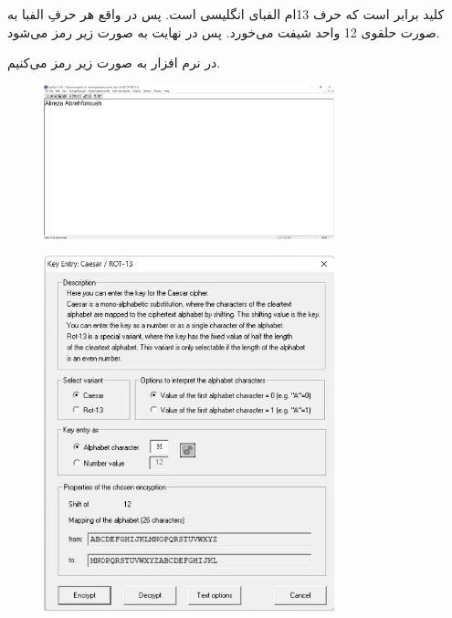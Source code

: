 \documentclass{article}
\begin{document}
\subsubsection{}
کلید  برابر  است که حرف 13ام الفبای انگلیسی است. پس در واقع هر حرفِ الفبا به صورت حلقوی 12 واحد شیفت می‌خورد. پس در نهایت به صورت زیر رمز می‌شود.
\begin{latin}
\begin{table}[H]
\centering
{}
\end{table}
\end{latin}
در نرم افزار  به صورت زیر رمز می‌کنیم.
\begin{figure}[H]
    \centering
    \includegraphics[width=0.75\textwidth]{figures/1a.jpg}
    \caption
	{}
    \label{fig:fig1}
\end{figure}

\begin{figure}[H]
    \centering
    \includegraphics[width=0.75\textwidth]{figures/1b.jpg}
    \caption
	{}
    \label{fig:fig1}
\end{figure}
\end{document}
